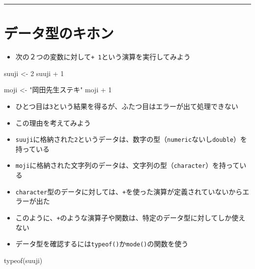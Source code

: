 \documentclass[
]{book}
\newenvironment{Shaded}{\begin{snugshade}}{\end{snugshade}}
\newcommand{\DecValTok}[1]{\textcolor[rgb]{0.00,0.00,0.81}{#1}}
\newcommand{\FunctionTok}[1]{\textcolor[rgb]{0.00,0.00,0.00}{#1}}
\newcommand{\NormalTok}[1]{#1}
\newcommand{\OtherTok}[1]{\textcolor[rgb]{0.56,0.35,0.01}{#1}}
\newcommand{\SpecialCharTok}[1]{\textcolor[rgb]{0.00,0.00,0.00}{#1}}
\newcommand{\StringTok}[1]{\textcolor[rgb]{0.31,0.60,0.02}{#1}}
\providecommand{\tightlist}{%
  \setlength{\itemsep}{0pt}\setlength{\parskip}{0pt}}
\begin{document}
\begin{center}\rule{0.5\linewidth}{0.5pt}\end{center}

\hypertarget{ux30c7ux30fcux30bfux578bux306eux30adux30dbux30f3}{%
\section{データ型のキホン}\label{ux30c7ux30fcux30bfux578bux306eux30adux30dbux30f3}}

\begin{itemize}
\tightlist
\item
  次の２つの変数に対して\texttt{+\ 1}という演算を実行してみよう
\end{itemize}

\begin{Shaded}
\begin{Highlighting}[]
\NormalTok{suuji }\OtherTok{\textless{}{-}} \DecValTok{2} 
\NormalTok{suuji }\SpecialCharTok{+} \DecValTok{1} 

\NormalTok{moji }\OtherTok{\textless{}{-}} \StringTok{"岡田先生ステキ"}
\NormalTok{moji }\SpecialCharTok{+} \DecValTok{1}
\end{Highlighting}
\end{Shaded}

\begin{itemize}
\tightlist
\item
  ひとつ目は\texttt{3}という結果を得るが、ふたつ目はエラーが出て処理できない
\item
  この理由を考えてみよう
\item
  \texttt{suuji}に格納された\texttt{2}というデータは、数字の型（\texttt{numeric}ないし\texttt{double}）を持っている\\
\item
  \texttt{moji}に格納された文字列のデータは、文字列の型（\texttt{character}）を持っている\\
\item
  \texttt{character}型のデータに対しては、\texttt{+}を使った演算が定義されていないからエラーが出た\\
\item
  このように、\texttt{+}のような演算子や関数は、特定のデータ型に対してしか使えない
\item
  データ型を確認するには\texttt{typeof()}か\texttt{mode()}の関数を使う
\end{itemize}

\begin{Shaded}
\begin{Highlighting}[]
\FunctionTok{typeof}\NormalTok{(suuji)}
\end{Highlighting}
\end{Shaded}
\end{document}

